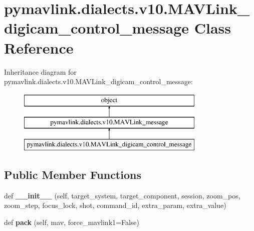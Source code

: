 \hypertarget{classpymavlink_1_1dialects_1_1v10_1_1MAVLink__digicam__control__message}{}\section{pymavlink.\+dialects.\+v10.\+M\+A\+V\+Link\+\_\+digicam\+\_\+control\+\_\+message Class Reference}
\label{classpymavlink_1_1dialects_1_1v10_1_1MAVLink__digicam__control__message}
Inheritance diagram for pymavlink.\+dialects.\+v10.\+M\+A\+V\+Link\+\_\+digicam\+\_\+control\+\_\+message\+:\begin{figure}[H]
\begin{center}
\leavevmode
\includegraphics[height=3.000000cm]{classpymavlink_1_1dialects_1_1v10_1_1MAVLink__digicam__control__message}
\end{center}
\end{figure}
\subsection*{Public Member Functions}
\begin{DoxyCompactItemize}
\item 
\mbox{\label{classpymavlink_1_1dialects_1_1v10_1_1MAVLink__digicam__control__message_aa7d8fe0dcd02a5af937e23b51dc94930}} 
def {\bfseries \+\_\+\+\_\+init\+\_\+\+\_\+} (self, target\+\_\+system, target\+\_\+component, session, zoom\+\_\+pos, zoom\+\_\+step, focus\+\_\+lock, shot, command\+\_\+id, extra\+\_\+param, extra\+\_\+value)
\item 
\mbox{\label{classpymavlink_1_1dialects_1_1v10_1_1MAVLink__digicam__control__message_a8385420f8f5b630399083dfc9f674678}} 
def {\bfseries pack} (self, mav, force\+\_\+mavlink1=False)
\end{DoxyCompactItemize}
